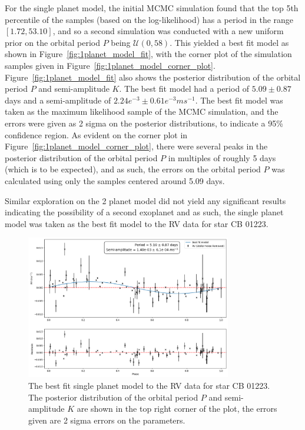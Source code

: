 For the single planet model, the initial MCMC simulation found that the top 5th percentile of the samples (based on the
log-likelihood) has a period in the range $[1.72, 53.10]$, and so a second simulation was conducted with a new uniform
prior on the orbital period $P$ being $\mathcal{U}(0, 58)$.
This yielded a best fit model as shown in Figure~\eqref{fig:1planet_model_fit}, with the corner plot of the simulation
samples given in Figure~\eqref{fig:1planet_model_corner_plot}.
Figure~\eqref{fig:1planet_model_fit} also shows the posterior distribution of the orbital period $P$ and semi-amplitude $K$.
The best fit model had a period of $5.09 \pm 0.87$ days and a semi-amplitude of $2.24e^{-3} \pm 0.61e^{-3} ms^{-1}$.
The best fit model was taken as the maximum likelihood sample of the MCMC simulation, and the errors were given
as 2 sigma on the posterior distributions, to indicate a 95\% confidence region.
As evident on the corner plot in Figure~\eqref{fig:1planet_model_corner_plot}, there were several peaks in the posterior
distribution of the orbital period $P$ in multiples of roughly 5 days (which is to be expected), and as such, the
errors on the orbital period $P$ was calculated using only the samples centered around 5.09 days.

Similar exploration on the 2 planet model did not yield any significant results indicating the possibility of a second
exoplanet and as such, the single planet model was taken as the best fit model to the RV data for star CB 01223.

\begin{figure}[htb]
    \centering
    \includegraphics[width=0.8\textwidth]{figures/1planet_model_fit}
    \caption{The best fit single planet model to the RV data for star CB 01223.
    The posterior distribution of the orbital period $P$ and semi-amplitude $K$ are shown in the top right corner of the plot,
    the errors given are 2 sigma errors on the parameters.}
    \label{fig:1planet_model_fit}
\end{figure}

